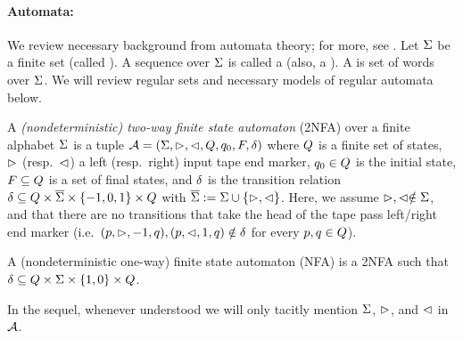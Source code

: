\paragraph{Automata: } We review necessary background from automata theory;
for more, see \cite{Kozen-automata}. Let $\Sigma$ be a finite set (called
). A sequence over $\Sigma$ is called a 
(also, a ). A  is set of words over $\Sigma$.
We will review regular sets and necessary models of regular automata below.

\begin{definition}
    A \emph{(nondeterministic) two-way finite state automaton}
(2NFA) over a finite alphabet $\Sigma$ is a tuple $\mathcal{A} =
(\Sigma, \vartriangleright, \vartriangleleft, Q, q_0, F, \delta)$ where 
    $Q$ is a finite set of 
    states, $\vartriangleright$ (resp.~$\vartriangleleft$) a left (resp.~right) input tape end 
    marker, $q_0\in Q$ is
the initial state, $F\subseteq Q$ is a set of final states, and 
    $\delta$ is the
transition relation  $\delta\subseteq Q \times 
    \overline{\Sigma}\times \{-1, 0, 1\}\times Q$ with
    $\overline{\Sigma} := \Sigma \cup \{\vartriangleright,\vartriangleleft\}$.
    Here, we assume $\vartriangleright, \vartriangleleft \notin \Sigma$, and that
    there are no transitions that take the head of the tape pass left/right
    end marker (i.e.~$(p,\vartriangleright,-1,q), (p,\vartriangleleft,1,q) \notin
    \delta$ for every $p, q \in Q$).

    A (nondeterministic one-way) finite state automaton (NFA)
is a 2NFA such that $\delta\subseteq Q \times \Sigma\times
    \{1,0\} \times Q $.
\end{definition}
In the sequel, whenever understood we will only tacitly mention $\Sigma$, 
$\vartriangleright$, and $\vartriangleleft$ in $\mathcal{A}$. 


